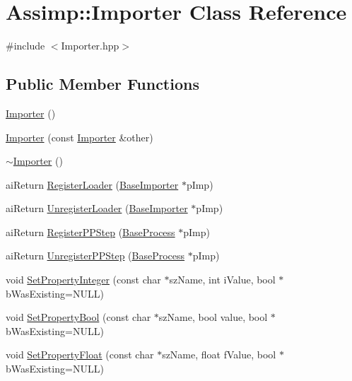 \hypertarget{class_assimp_1_1_importer}{\section{Assimp\+:\+:Importer Class Reference}
\label{class_assimp_1_1_importer}
}


{\ttfamily \#include $<$Importer.\+hpp$>$}

\subsection*{Public Member Functions}
\begin{DoxyCompactItemize}
\item 
\hyperlink{class_assimp_1_1_importer_afaf93b56e3558a92405ab627ab8ee1d1}{Importer} ()
\item 
\hyperlink{class_assimp_1_1_importer_a1e9db1804ab4902744d0656fc02be422}{Importer} (const \hyperlink{class_assimp_1_1_importer}{Importer} \&other)
\item 
\hyperlink{class_assimp_1_1_importer_a6e61faae5020f2dc034ff3ea4032a537}{$\sim$\+Importer} ()
\item 
ai\+Return \hyperlink{class_assimp_1_1_importer_abcc305be574981373b0abb9da655f101}{Register\+Loader} (\hyperlink{class_assimp_1_1_base_importer}{Base\+Importer} $\ast$p\+Imp)
\item 
ai\+Return \hyperlink{class_assimp_1_1_importer_ae0197ab773e3658b9f5aa398cfe67fcf}{Unregister\+Loader} (\hyperlink{class_assimp_1_1_base_importer}{Base\+Importer} $\ast$p\+Imp)
\item 
ai\+Return \hyperlink{class_assimp_1_1_importer_a5c301586244c65314e649d9899dc693d}{Register\+P\+P\+Step} (\hyperlink{class_assimp_1_1_base_process}{Base\+Process} $\ast$p\+Imp)
\item 
ai\+Return \hyperlink{class_assimp_1_1_importer_a2ea08b99c2742e181c85253454942a02}{Unregister\+P\+P\+Step} (\hyperlink{class_assimp_1_1_base_process}{Base\+Process} $\ast$p\+Imp)
\item 
void \hyperlink{class_assimp_1_1_importer_a89d8be96d3eb3f5d79db8c09c8d37ccb}{Set\+Property\+Integer} (const char $\ast$sz\+Name, int i\+Value, bool $\ast$b\+Was\+Existing=N\+U\+L\+L)
\item 
void \hyperlink{class_assimp_1_1_importer_acf161a9fdd0d2ed3902e325351311389}{Set\+Property\+Bool} (const char $\ast$sz\+Name, bool value, bool $\ast$b\+Was\+Existing=N\+U\+L\+L)
\item 
void \hyperlink{class_assimp_1_1_importer_a20da8f80c01961ea6e65cfa2f9866097}{Set\+Property\+Float} (const char $\ast$sz\+Name, float f\+Value, bool $\ast$b\+Was\+Existing=N\+U\+L\+L)

\end{DoxyCompactItemize}
